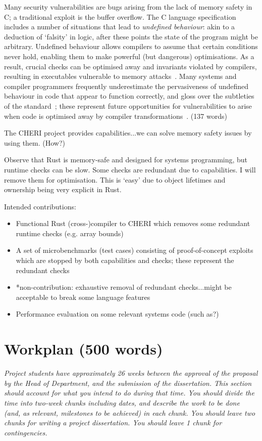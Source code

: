 \documentclass[11pt]{article}
\begin{document}
Many security vulnerabilities are bugs arising from the lack of memory safety in C; a traditional exploit is the buffer overflow.
The C language specification includes a number of situations that lead to \emph{undefined behaviour}: akin to a deduction of `falsity' in logic, after these points the state of the program might be arbitrary.
Undefined behaviour allows compilers to assume that certain conditions never hold, enabling them to make powerful (but dangerous) optimisations.
As a result, crucial checks can be optimised away and invariants violated by compilers, resulting in executables vulnerable to memory attacks~\cite{simon2018wygiwyc}.
Many systems and compiler programmers frequently underestimate the pervasiveness of undefined behaviour in code that appear to function correctly, and gloss over the subtleties of the standard~\cite{memarian2016cdepths};
these represent future opportunities for vulnerabilities to arise when code is optimised away by compiler transformations~\cite{wang2013towards}.
(137 words)

The CHERI project provides capabilities...we can solve memory safety issues by using them. (How?)

Observe that Rust is memory-safe and designed for systems programming, but runtime checks can be slow.
Some checks are redundant due to capabilities.
I will remove them for optimisation.
This is `easy' due to object lifetimes and ownership being very explicit in Rust.

Intended contributions:
\begin{itemize}
  \item Functional Rust (cross-)compiler to CHERI which removes some redundant runtime checks (e.g. array bounds)
  \item A set of microbenchmarks (test cases) consisting of proof-of-concept exploits which are stopped by both capabilities and checks; these represent the redundant checks
  \item *non-contribution: exhaustive removal of redundant checks...might be acceptable to break some language features
  \item Performance evaluation on some relevant systems code (such as?)
\end{itemize}

\section{Workplan (500 words)}
\textsl{Project students have approximately 26 weeks between the approval of 
the proposal by the Head of Department, and the submission of the dissertation. This section
should account for what you intend to do during that time. You should divide the time into two-week chunks including dates, and 
describe the work to be done (and, as relevant, milestones to be 
achieved) in each chunk. You should leave two 
chunks for writing a project dissertation. You should leave 1 chunk for contingencies.} 




\newpage
\appendix
\end{document}
